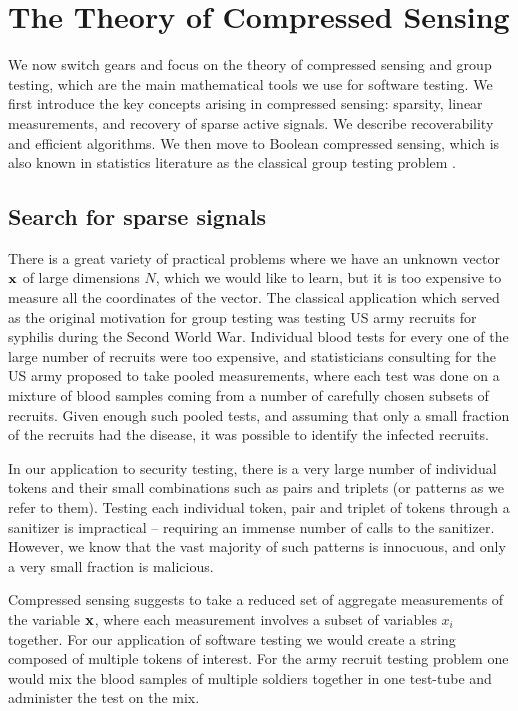 \section{The Theory of Compressed Sensing}

We now switch gears and focus on the theory of compressed sensing and group testing, which are the main mathematical tools we use for software testing. We first introduce the key concepts arising in compressed sensing: sparsity, linear measurements, and recovery of sparse active signals. We describe recoverability and efficient algorithms. We then move to Boolean compressed sensing, which is also known in statistics literature as the classical group testing problem \cite{dorfman1943detection, group_testing}. 


\subsection{Search for sparse signals}

There is a great variety of practical problems where we have an unknown vector $\mathbf{x}$
of large dimensions $N$, which we would like to learn, but it is too expensive to measure all
the coordinates of the vector. The classical application which served as the original motivation
for group testing was testing US army recruits for syphilis during the Second World War. 
Individual blood tests for every one of the large number of recruits were too expensive, 
and statisticians consulting for the US army proposed to take pooled measurements, where 
each test was done on a mixture of blood samples coming from a number of carefully chosen subsets of recruits. Given enough such pooled tests, and assuming that only a small fraction of the recruits had the disease, it was possible to identify the infected recruits.  


In our application to security testing, there is a very large number of individual tokens and 
their small combinations such as pairs and triplets (or patterns as we refer to them). Testing each individual token, pair and 
triplet of tokens through a sanitizer is impractical -- requiring an immense number of calls to the 
sanitizer. However, we know that the vast majority of such patterns is innocuous, 
and only a very small fraction is malicious. 

Compressed sensing suggests to take a reduced set of aggregate measurements of the variable $\mathbf{x}$,
where each measurement involves a subset of variables $x_i$ together.  For our application of
software testing we would create a string composed of multiple tokens of interest.  For the
army recruit testing problem one would mix the blood samples of multiple soldiers together
in one test-tube and administer the test on the mix.


